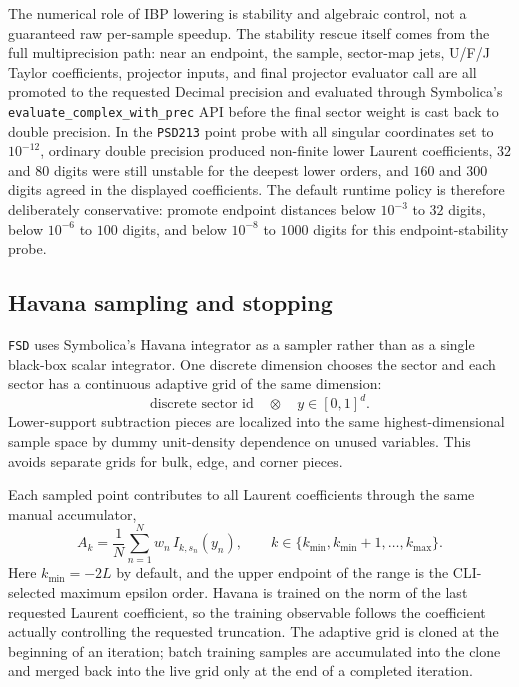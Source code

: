 \documentclass[11pt]{article}
\begin{document}
The numerical role of IBP lowering is stability and algebraic control, not a
guaranteed raw per-sample speedup.  The stability rescue itself comes from the
full multiprecision path: near an endpoint, the sample, sector-map jets, U/F/J
Taylor coefficients, projector inputs, and final projector evaluator call are
all promoted to the requested Decimal precision and evaluated through
Symbolica's \texttt{evaluate\_complex\_with\_prec} API before the final sector
weight is cast back to double precision.  In the \texttt{PSD213} point probe
with all singular coordinates set to \(10^{-12}\), ordinary double precision
produced non-finite lower Laurent coefficients, \(32\) and \(80\) digits were
still unstable for the deepest lower orders, and \(160\) and \(300\) digits
agreed in the displayed coefficients.  The default runtime policy is therefore
deliberately conservative: promote endpoint distances below \(10^{-3}\) to
\(32\) digits, below \(10^{-6}\) to \(100\) digits, and below \(10^{-8}\) to
\(1000\) digits for this endpoint-stability probe.

\subsection{Havana sampling and stopping}

\texttt{FSD} uses Symbolica's Havana integrator as a sampler rather than as a
single black-box scalar integrator.  One discrete dimension chooses the sector
and each sector has a continuous adaptive grid of the same dimension:
\begin{equation}
  \text{discrete sector id}
  \quad\otimes\quad
  y\in[0,1]^d.
\end{equation}
Lower-support subtraction pieces are localized into the same highest-dimensional
sample space by dummy unit-density dependence on unused variables.  This avoids
separate grids for bulk, edge, and corner pieces.

Each sampled point contributes to all Laurent coefficients through the same
manual accumulator,
\begin{equation}
  A_k
  =
  \frac{1}{N}\sum_{n=1}^{N}
  w_n\,I_{k,s_n}(y_n),
  \qquad
  k\in\{k_{\min},k_{\min}+1,\ldots,k_{\max}\}.
\end{equation}
Here \(k_{\min}=-2L\) by default, and the upper endpoint of the range is the
CLI-selected maximum epsilon order.  Havana is trained on the norm of the last
requested Laurent coefficient, so the training observable follows the
coefficient actually controlling the requested truncation.  The adaptive grid
is cloned at the beginning of an iteration; batch training samples are
accumulated into the clone and merged back into the live grid only at the end
of a completed iteration.
\end{document}

